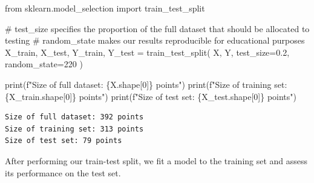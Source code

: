 \documentclass[
  letterpaper,
  DIV=11,
  numbers=noendperiod]{scrreprt}
\newenvironment{Shaded}{\begin{snugshade}}{\end{snugshade}}
\newcommand{\BuiltInTok}[1]{\textcolor[rgb]{0.00,0.23,0.31}{#1}}
\newcommand{\CommentTok}[1]{\textcolor[rgb]{0.37,0.37,0.37}{#1}}
\newcommand{\DecValTok}[1]{\textcolor[rgb]{0.68,0.00,0.00}{#1}}
\newcommand{\FloatTok}[1]{\textcolor[rgb]{0.68,0.00,0.00}{#1}}
\newcommand{\ImportTok}[1]{\textcolor[rgb]{0.00,0.46,0.62}{#1}}
\newcommand{\NormalTok}[1]{\textcolor[rgb]{0.00,0.23,0.31}{#1}}
\newcommand{\OperatorTok}[1]{\textcolor[rgb]{0.37,0.37,0.37}{#1}}
\newcommand{\SpecialCharTok}[1]{\textcolor[rgb]{0.37,0.37,0.37}{#1}}
\newcommand{\SpecialStringTok}[1]{\textcolor[rgb]{0.13,0.47,0.30}{#1}}
\begin{document}
\begin{Shaded}
\begin{Highlighting}[]
\ImportTok{from}\NormalTok{ sklearn.model\_selection }\ImportTok{import}\NormalTok{ train\_test\_split}

\CommentTok{\# \textasciigrave{}test\_size\textasciigrave{} specifies the proportion of the full dataset that should be allocated to testing}
\CommentTok{\# \textasciigrave{}random\_state\textasciigrave{} makes our results reproducible for educational purposes}
\NormalTok{X\_train, X\_test, Y\_train, Y\_test }\OperatorTok{=}\NormalTok{ train\_test\_split(}
\NormalTok{        X, }
\NormalTok{        Y, }
\NormalTok{        test\_size}\OperatorTok{=}\FloatTok{0.2}\NormalTok{, }
\NormalTok{        random\_state}\OperatorTok{=}\DecValTok{220}
\NormalTok{    )}

\BuiltInTok{print}\NormalTok{(}\SpecialStringTok{f"Size of full dataset: }\SpecialCharTok{\{}\NormalTok{X}\SpecialCharTok{.}\NormalTok{shape[}\DecValTok{0}\NormalTok{]}\SpecialCharTok{\}}\SpecialStringTok{ points"}\NormalTok{)}
\BuiltInTok{print}\NormalTok{(}\SpecialStringTok{f"Size of training set: }\SpecialCharTok{\{}\NormalTok{X\_train}\SpecialCharTok{.}\NormalTok{shape[}\DecValTok{0}\NormalTok{]}\SpecialCharTok{\}}\SpecialStringTok{ points"}\NormalTok{)}
\BuiltInTok{print}\NormalTok{(}\SpecialStringTok{f"Size of test set: }\SpecialCharTok{\{}\NormalTok{X\_test}\SpecialCharTok{.}\NormalTok{shape[}\DecValTok{0}\NormalTok{]}\SpecialCharTok{\}}\SpecialStringTok{ points"}\NormalTok{)}
\end{Highlighting}
\end{Shaded}

\begin{verbatim}
Size of full dataset: 392 points
Size of training set: 313 points
Size of test set: 79 points
\end{verbatim}

After performing our train-test split, we fit a model to the training
set and assess its performance on the test set.
\end{document}
